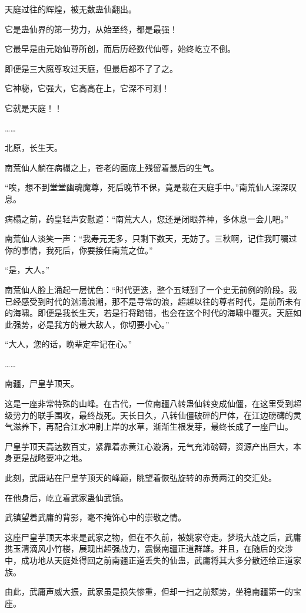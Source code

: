 \begin{this_body}
天庭过往的辉煌，被无数蛊仙翻出。

它是蛊仙界的第一势力，从始至终，都是最强！

它最早是由元始仙尊所创，而后历经数代仙尊，始终屹立不倒。

即便是三大魔尊攻过天庭，但最后都不了了之。

它神秘，它强大，它高高在上，它深不可测！

它就是天庭！！

……

北原，长生天。

南荒仙人躺在病榻之上，苍老的面庞上残留着最后的生气。

“唉，想不到堂堂幽魂魔尊，死后晚节不保，竟是栽在天庭手中。”南荒仙人深深叹息。

病榻之前，药皇轻声安慰道：“南荒大人，您还是闭眼养神，多休息一会儿吧。”

南荒仙人淡笑一声：“我寿元无多，只剩下数天，无妨了。三秋啊，记住我叮嘱过你的事情，我死后，你要接任南荒之位。”

“是，大人。”

南荒仙人脸上涌起一层忧色：“时代更迭，整个五域到了一个史无前例的阶段。我已经感受到时代的汹涌浪潮，那不是寻常的浪，超越以往的尊者时代，是前所未有的海啸。即便是我长生天，若是行将踏错，也会在这个时代的海啸中覆灭。天庭如此强势，必是我方的最大敌人，你切要小心。”

“大人，您的话，晚辈定牢记在心。”

……

南疆，尸皇芋顶天。

这是一座非常特殊的山峰。在古代，一位南疆八转蛊仙转变成仙僵，在这里受到超级势力的联手围攻，最终战死。天长日久，八转仙僵破碎的尸体，在江边磅礴的灵气滋养下，再配合江水冲刷上岸的水草，渐渐生根发芽，最终长成了一座尸山。

尸皇芋顶天高达数百丈，紧靠着赤黄江心漩涡，元气充沛磅礴，资源产出巨大，本身更是战略要冲之地。

此刻，武庸站在尸皇芋顶天的峰巅，眺望着恢弘旋转的赤黄两江的交汇处。

在他身后，屹立着武家蛊仙武镇。

武镇望着武庸的背影，毫不掩饰心中的崇敬之情。

这座尸皇芋顶天本来是武家之物，但在不久前，被姚家夺走。梦境大战之后，武庸携玉清滴风小竹楼，展现出超强战力，震慑南疆正道群雄。并且，在随后的交涉中，成功地从天庭处得回之前南疆正道丢失的仙蛊，武庸将其大多分散还给正道家族。

由此，武庸声威大振，武家虽是损失惨重，但却一扫之前颓势，坐稳南疆第一的宝座。


\end{this_body}
